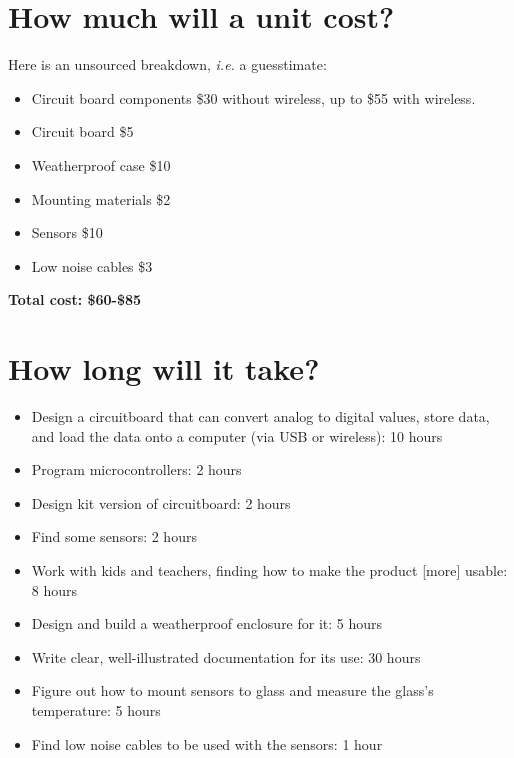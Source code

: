 \documentclass[11pt]{article}
\begin{document}
\section{How much will a unit cost?}
Here is an unsourced breakdown, \textit{i.e.} a guesstimate:
\begin{itemize}
\item Circuit board components \$30 without wireless, up to \$55 with wireless.
\item Circuit board \$5
\item Weatherproof case \$10
\item Mounting materials \$2
\item Sensors \$10
\item Low noise cables \$3
\end{itemize}

\textbf{Total cost: \$60-\$85}
 
\section{How long will it take?}
\begin{itemize}
\item Design a circuitboard that can convert analog to digital values, store data, and load the data onto a computer (via USB or wireless): 10 hours
\item Program microcontrollers: 2 hours
\item Design kit version of circuitboard: 2 hours
\item Find some sensors: 2 hours
\item Work with kids and teachers, finding how to make the product [more] usable: 8 hours
\item Design and build a weatherproof enclosure for it: 5 hours
\item Write clear, well-illustrated documentation for its use: 30 hours
\item Figure out how to mount sensors to glass and measure the glass's temperature: 5 hours
\item Find low noise cables to be used with the sensors: 1 hour
\end{itemize}
\end{document}
